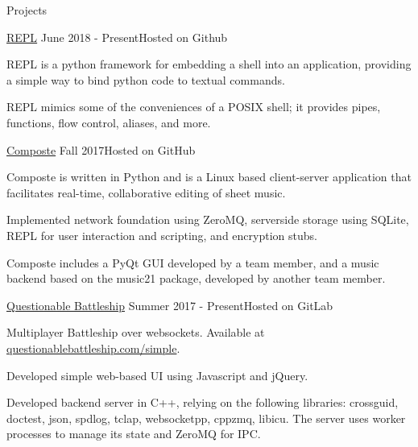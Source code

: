 \documentclass{resume} %
\begin{document}
\begin{rSection}{Projects}

\begin{rSubsection}
    {\href{https://github.com/946336/The-Worst-REPL}{REPL}}
    {June 2018 - Present}{Hosted on Github}

\item REPL is a python framework for embedding a shell into an application,
    providing a simple way to bind python code to textual commands.

\item REPL mimics some of the conveniences of a POSIX shell; it provides pipes,
    functions, flow control, aliases, and more.

\end{rSubsection}

\begin{rSubsection}
    {\href{https://composte.me}{Composte}}
    {Fall 2017}{Hosted on GitHub}

\item Composte is written in Python and is a Linux based client-server
    application that facilitates real-time, collaborative editing of sheet
    music.

\item Implemented network foundation using ZeroMQ, serverside storage using
    SQLite, REPL for user interaction and scripting, and encryption stubs.

\item Composte includes a PyQt GUI developed by a team member, and a music
    backend based on the music21 package, developed by another team member.

\end{rSubsection}

\begin{rSubsection}
    {\href{https://www.questionablebattleship.com/}{Questionable Battleship}}
    {Summer 2017 - Present}{Hosted on GitLab}

\item Multiplayer Battleship over websockets. Available at
    \href{https://questionablebattleship.com/simple}{questionablebattleship.com/simple}.

\item Developed simple web-based UI using Javascript and jQuery.

\item Developed backend server in C++, relying on the following libraries:
    crossguid, doctest, json, spdlog, tclap, websocketpp, cppzmq,
    libicu. The server uses worker processes to manage its state and ZeroMQ
    for IPC.


\end{rSubsection}
\end{rSection}
\end{document}
